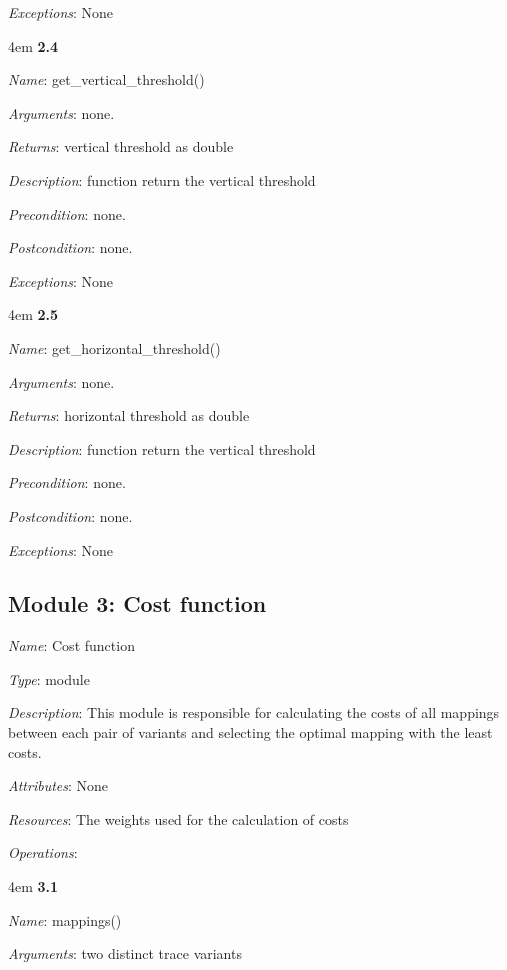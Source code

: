\documentclass[notitlepage]{article}
\begin{document}
\begin{flushleft}
\textit{Exceptions}: None
\par
\endgroup

\par
\begingroup
\leftskip4em
\textbf{2.4} 

\textit{Name}: get\_vertical\_threshold()

\textit{Arguments}: none.

\textit{Returns}: vertical threshold as double

\textit{Description}: function return the vertical threshold

\textit{Precondition}: none.

\textit{Postcondition}: none.

\textit{Exceptions}: None
\par
\endgroup

\par
\begingroup
\leftskip4em
\textbf{2.5} 

\textit{Name}: get\_horizontal\_threshold()

\textit{Arguments}: none.

\textit{Returns}: horizontal threshold as double

\textit{Description}: function return the vertical threshold

\textit{Precondition}: none.

\textit{Postcondition}: none.

\textit{Exceptions}: None
\par
\endgroup


\subsection{Module 3: Cost function}
\textit{Name}: Cost function

\textit{Type}: module

\textit{Description}: This module is responsible for calculating the costs of all mappings between each pair of variants and selecting the optimal mapping with the least costs. 

\textit{Attributes}: None

\textit{Resources}: The weights used for the calculation of costs

\textit{Operations}: 
\medskip

\par
\begingroup
\leftskip4em
\textbf{3.1} 

\textit{Name}: mappings()

\textit{Arguments}: two distinct trace variants 


\end{flushleft}
\end{document}
